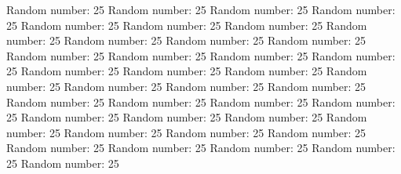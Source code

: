 \documentclass{article}%
\begin{document}
%
\normalsize%
Random number: 25\newline%
%
Random number: 25\newline%
%
Random number: 25\newline%
%
Random number: 25\newline%
%
Random number: 25\newline%
%
Random number: 25\newline%
%
Random number: 25\newline%
%
Random number: 25\newline%
%
Random number: 25\newline%
%
Random number: 25\newline%
%
Random number: 25\newline%
%
Random number: 25\newline%
%
Random number: 25\newline%
%
Random number: 25\newline%
%
Random number: 25\newline%
%
Random number: 25\newline%
%
Random number: 25\newline%
%
Random number: 25\newline%
%
Random number: 25\newline%
%
Random number: 25\newline%
%
Random number: 25\newline%
%
Random number: 25\newline%
%
Random number: 25\newline%
%
Random number: 25\newline%
%
Random number: 25\newline%
%
Random number: 25\newline%
%
Random number: 25\newline%
%
Random number: 25\newline%
%
Random number: 25\newline%
%
Random number: 25\newline%
%
Random number: 25\newline%
%
Random number: 25\newline%
%
Random number: 25\newline%
%
Random number: 25\newline%
%
Random number: 25\newline%
%
Random number: 25\newline%
%
Random number: 25\newline%
%
Random number: 25\newline%
\end{document}
